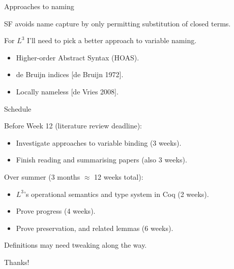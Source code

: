 \documentclass[10pt]{beamer}
\begin{document}
\begin{frame}{Approaches to naming}

SF avoids name capture by only permitting substitution of closed terms.

For $L^3$ I'll need to pick a better approach to variable naming.

\begin{itemize}
\item Higher-order Abstract Syntax (HOAS).
\item de Bruijn indices [de Bruijn 1972].
\item Locally nameless [de Vries 2008].
\end{itemize}
\end{frame}

\begin{frame}{Schedule}

Before Week 12 (literature review deadline):

\begin{itemize}
\item Investigate approaches to variable binding (3 weeks).
\item Finish reading and summarising papers (also 3 weeks).
\end{itemize}

Over summer (3 months $\approx$ 12 weeks total):

\begin{itemize}
\item $L^3$'s operational semantics and type system in Coq (2 weeks).
\item Prove progress (4 weeks).
\item Prove preservation, and related lemmas (6 weeks).
\end{itemize}

Definitions may need tweaking along the way.
\end{frame}

\begin{frame}

\end{frame}

\begin{frame}
Thanks!
\end{frame}
\end{document}
